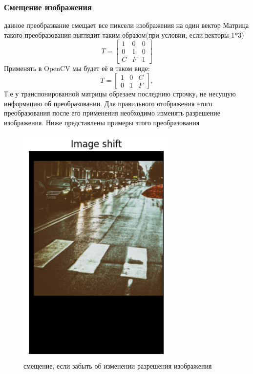 \documentclass[a4paper,12pt]{article}
\begin{document}
\subsubsection{Смещение изображения}
данное преобразвание смещает все пиксели изображения на один вектор
Матрица такого преобразования выглядит таким образом(при условии, если векторы 1*3)
$$
	T =
	\begin{bmatrix}
		1 & 0 & 0
		\\ 0 & 1 & 0
		\\ C & F & 1
	\end{bmatrix}
$$
Применять в OpenCV мы будет её в таком виде:
$$
	T =
	\begin{bmatrix}
		1 & 0 & C
		\\ 0 & 1 & F
	\end{bmatrix},
$$
Т.е у транспонированной матрицы обрезаем последнию строчку, не несущую информацию об преобразовании. 
Для правильного отображения этого преобразования после его применения необходимо изменять разрешение изображения. 
Ниже представлены примеры этого преобразования
\begin{figure}[H]
    \centering \includegraphics[width=0.7\textwidth]{my_images/3.png}
    \caption{смещение, если забыть об изменении разрешения изображения}
\end{figure}
\end{document}
